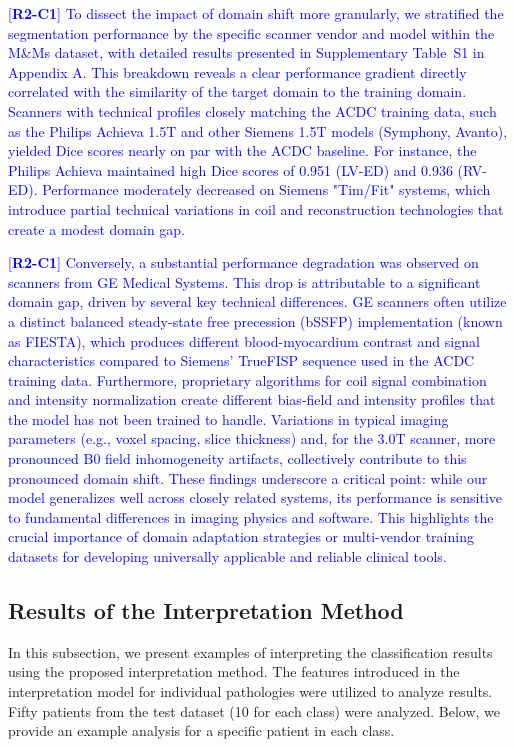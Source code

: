 \documentclass[fleqn,10pt]{wlscirep}
\newcommand{\revtag}[2]{[\textbf{R#1-C#2}]}
\newcommand{\Rtwo}[1]{\textcolor{blue}{#1}}
\begin{document}
\Rtwo{\revtag{2}{1} To dissect the impact of domain shift more granularly, we stratified the segmentation performance by the specific scanner vendor and model within the M\&Ms dataset, with detailed results presented in Supplementary Table~S1 in Appendix A. This breakdown reveals a clear performance gradient directly correlated with the similarity of the target domain to the training domain. Scanners with technical profiles closely matching the ACDC training data, such as the Philips Achieva 1.5T and other Siemens 1.5T models (Symphony, Avanto), yielded Dice scores nearly on par with the ACDC baseline. For instance, the Philips Achieva maintained high Dice scores of 0.951 (LV-ED) and 0.936 (RV-ED). Performance moderately decreased on Siemens "Tim/Fit" systems, which introduce partial technical variations in coil and reconstruction technologies that create a modest domain gap.}

\Rtwo{\revtag{2}{1} Conversely, a substantial performance degradation was observed on scanners from GE Medical Systems. This drop is attributable to a significant domain gap, driven by several key technical differences. GE scanners often utilize a distinct balanced steady-state free precession (bSSFP) implementation (known as FIESTA), which produces different blood-myocardium contrast and signal characteristics compared to Siemens' TrueFISP sequence used in the ACDC training data. Furthermore, proprietary algorithms for coil signal combination and intensity normalization create different bias-field and intensity profiles that the model has not been trained to handle. Variations in typical imaging parameters (e.g., voxel spacing, slice thickness) and, for the 3.0T scanner, more pronounced B0 field inhomogeneity artifacts, collectively contribute to this pronounced domain shift. These findings underscore a critical point: while our model generalizes well across closely related systems, its performance is sensitive to fundamental differences in imaging physics and software. This highlights the crucial importance of domain adaptation strategies or multi-vendor training datasets for developing universally applicable and reliable clinical tools.}

\subsection*{Results of the Interpretation Method}

In this subsection, we present examples of interpreting the classification results using the proposed interpretation method. The features introduced in the interpretation model for individual pathologies were utilized to analyze results. Fifty patients from the test dataset (10 for each class) were analyzed. Below, we provide an example analysis for a specific patient in each class.
\end{document}
